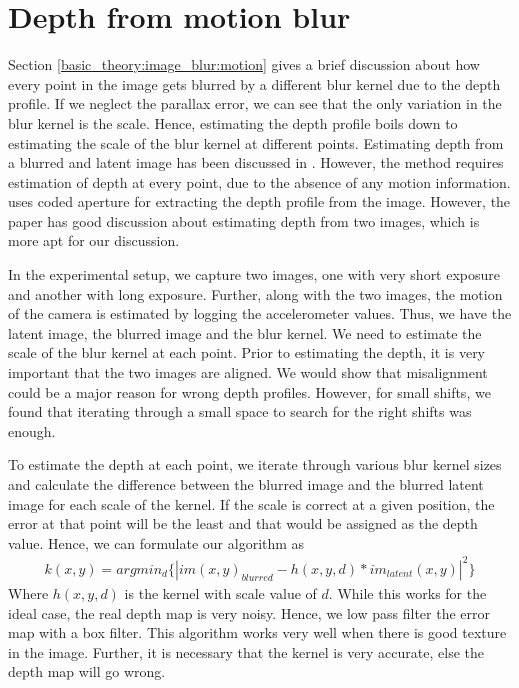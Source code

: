 \documentclass[BTech]{iitmdiss}
\begin{document}
\section{Depth from motion blur}
\label{depth_estimation:motion}
Section \ref{basic_theory:image_blur:motion} gives a brief discussion 
about how every point in the image gets blurred by a different blur 
kernel due to the depth profile. If we neglect the parallax error, we 
can see that the only variation in the blur kernel is the scale. Hence,
estimating the depth profile boils down to estimating the scale of the 
blur kernel at different points. Estimating depth from a blurred and 
latent image has been discussed in \cite{paramanand2010unscented}. However,
the method requires estimation of depth at every point, due to the 
absence of any motion information. \cite{levin2007image} uses coded 
aperture for extracting the depth profile from the image. However, the
paper has good discussion about estimating depth from two images, which
is more apt for our discussion.

In the experimental setup, we capture two images, one with very short exposure and another with long exposure. 
Further, along with the two images, the motion of the camera is 
estimated by logging the accelerometer values. Thus, we have the latent
image, the blurred image and the blur kernel. We need to estimate the 
scale of the blur kernel at each point. Prior to estimating the depth,
it is very important that the two images are aligned. We would show that
misalignment could be a major reason for wrong depth profiles. However,
for small shifts, we found that iterating through a small space to search
for the right shifts was enough.

To estimate the depth at each point, we iterate through various blur
kernel sizes and calculate the difference between the blurred image and
the blurred latent image for each scale of the kernel. If the scale is
correct at a given position, the error at that point will be the least
and that would be assigned as the depth value. Hence, we can formulate
our algorithm as
\begin{align*}
k(x,y) = argmin_d\{|im(x,y)_{blurred}-h(x,y,d)*im_{latent}(x,y)|^2\}
\end{align*}
Where $h(x,y,d)$ is the kernel with scale value of $d$. While this works
for the ideal case, the real depth map is very noisy. Hence, we low pass
filter the error map with a box filter. This algorithm works very well
when there is good texture in the image. Further, it is necessary that
the kernel is very accurate, else the depth map will go wrong. 
\end{document}
